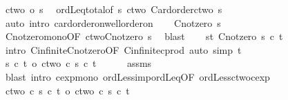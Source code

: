 \begin{isabellebody}
\ {\isachardoublequoteopen}ctwo\ {\isasymle}o\ s{\isachardoublequoteclose}\ \isamarkupfalse%
\ ordLeq{\isacharunderscore}{\kern0pt}total{\isacharbrackleft}{\kern0pt}of\ s\ ctwo{\isacharbrackright}{\kern0pt}\ Card{\isacharunderscore}{\kern0pt}order{\isacharunderscore}{\kern0pt}ctwo\ s\isanewline
\ \ \ \ \isamarkupfalse%
\ {\isacharparenleft}{\kern0pt}auto\ intro{\isacharcolon}{\kern0pt}\ card{\isacharunderscore}{\kern0pt}order{\isacharunderscore}{\kern0pt}on{\isacharunderscore}{\kern0pt}well{\isacharunderscore}{\kern0pt}order{\isacharunderscore}{\kern0pt}on{\isacharparenright}{\kern0pt}\isanewline
\ \ \isamarkupfalse%
\ {\isachardoublequoteopen}Cnotzero\ s{\isachardoublequoteclose}\ \isamarkupfalse%
\ Cnotzero{\isacharunderscore}{\kern0pt}mono{\isacharbrackleft}{\kern0pt}OF\ ctwo{\isacharunderscore}{\kern0pt}Cnotzero{\isacharbrackright}{\kern0pt}\ s\ \isamarkupfalse%
\ blast\isanewline
\ \ \isamarkupfalse%
\ st{\isacharcolon}{\kern0pt}\ {\isachardoublequoteopen}Cnotzero\ {\isacharparenleft}{\kern0pt}s\ {\isacharasterisk}{\kern0pt}c\ t{\isacharparenright}{\kern0pt}{\isachardoublequoteclose}\ \isamarkupfalse%
\ {\isacharparenleft}{\kern0pt}intro\ Cinfinite{\isacharunderscore}{\kern0pt}Cnotzero{\isacharbrackleft}{\kern0pt}OF\ Cinfinite{\isacharunderscore}{\kern0pt}cprod{}{\isacharbrackright}{\kern0pt}{\isacharparenright}{\kern0pt}\ {\isacharparenleft}{\kern0pt}auto\ simp{\isacharcolon}{\kern0pt}\ t{\isacharparenright}{\kern0pt}\isanewline
\ \ \isamarkupfalse%
\ {\isachardoublequoteopen}s\ {\isacharcircum}{\kern0pt}c\ t\ {\isasymle}o\ {\isacharparenleft}{\kern0pt}ctwo\ {\isacharcircum}{\kern0pt}c\ s{\isacharparenright}{\kern0pt}\ {\isacharcircum}{\kern0pt}c\ t{\isachardoublequoteclose}\isanewline
\ \ \ \ \isamarkupfalse%
\ assms\ \isamarkupfalse%
\ {\isacharparenleft}{\kern0pt}blast\ intro{\isacharcolon}{\kern0pt}\ cexp{\isacharunderscore}{\kern0pt}mono{}\ ordLess{\isacharunderscore}{\kern0pt}imp{\isacharunderscore}{\kern0pt}ordLeq{\isacharbrackleft}{\kern0pt}OF\ ordLess{\isacharunderscore}{\kern0pt}ctwo{\isacharunderscore}{\kern0pt}cexp{\isacharbrackright}{\kern0pt}{\isacharparenright}{\kern0pt}\isanewline
\ \ \isamarkupfalse%
\ \isamarkupfalse%
\ {\isachardoublequoteopen}{\isacharparenleft}{\kern0pt}ctwo\ {\isacharcircum}{\kern0pt}c\ s{\isacharparenright}{\kern0pt}\ {\isacharcircum}{\kern0pt}c\ t\ {\isacharequal}{\kern0pt}o\ ctwo\ {\isacharcircum}{\kern0pt}c\ {\isacharparenleft}{\kern0pt}s\ {\isacharasterisk}{\kern0pt}c\ t{\isacharparenright}{\kern0pt}{\isachardoublequoteclose}\isanewline

\end{isabellebody}

